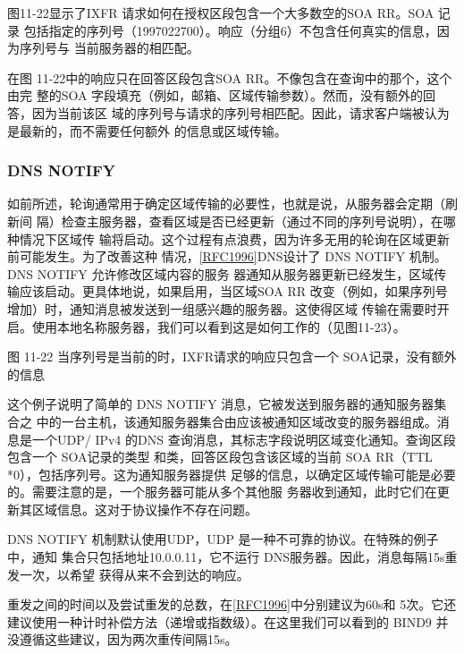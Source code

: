 图11-22显示了IXFR 请求如何在授权区段包含一个大多数空的SOA RR。SOA 记录
包括指定的序列号（1997022700）。响应（分组6）不包含任何真实的信息，因为序列号与
当前服务器的相匹配。

在图 11-22中的响应只在回答区段包含SOA RR。不像包含在查询中的那个，这个由完
整的SOA 字段填充（例如，邮箱、区域传输参数）。然而，没有额外的回答，因为当前该区
域的序列号与请求的序列号相匹配。因此，请求客户端被认为是最新的，而不需要任何额外
的信息或区域传输。

\subsubsection{DNS NOTIFY}

如前所述，轮询通常用于确定区域传输的必要性，也就是说，从服务器会定期（刷新间
隔）检查主服务器，查看区域是否已经更新（通过不同的序列号说明），在哪种情况下区域传
输将启动。这个过程有点浪费，因为许多无用的轮询在区域更新前可能发生。为了改善这种
情况，\href{https://www.rfc-editor.org/rfc/rfc1996}{[RFC1996]}DNS设计了 DNS NOTIFY 机制。DNS NOTIFY 允许修改区域内容的服务
器通知从服务器更新已经发生，区域传输应该启动。更具体地说，如果启用，当区域SOA
RR 改变（例如，如果序列号增加）时，通知消息被发送到一组感兴趣的服务器。这使得区域
传输在需要时开启。使用本地名称服务器，我们可以看到这是如何工作的（见图11-23）。

图 11-22 当序列号是当前的时，IXFR请求的响应只包含一个 SOA记录，没有额外的信息


这个例子说明了简单的 DNS NOTIFY 消息，它被发送到服务器的通知服务器集合之
中的一台主机，该通知服务器集合由应该被通知区域改变的服务器组成。消息是一个UDP/
IPv4 的DNS 查询消息，其标志字段说明区域变化通知。查询区段包含一个 SOA记录的类型
和类，回答区段包含该区域的当前 SOA RR（TTL *0），包括序列号。这为通知服务器提供
足够的信息，以确定区域传输可能是必要的。需要注意的是，一个服务器可能从多个其他服
务器收到通知，此时它们在更新其区域信息。这对于协议操作不存在问题。

DNS NOTIFY 机制默认使用UDP，UDP 是一种不可靠的协议。在特殊的例子中，通知
集合只包括地址10.0.0.11，它不运行 DNS服务器。因此，消息每隔15s重发一次，以希望
获得从来不会到达的响应。

\begin{tcolorbox}
    重发之间的时间以及尝试重发的总数，在\href{https://www.rfc-editor.org/rfc/rfc1996}{[RFC1996]}中分别建议为60s和
    5次。它还建议使用一种计时补偿方法（递增或指数级）。在这里我们可以看到的
    BIND9 并没遵循这些建议，因为两次重传间隔15s。
\end{tcolorbox}

